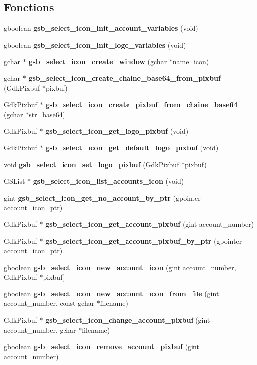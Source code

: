 \subsection*{Fonctions}
\begin{DoxyCompactItemize}
\item 
gboolean {\bf gsb\_\-select\_\-icon\_\-init\_\-account\_\-variables} (void)
\item 
gboolean {\bf gsb\_\-select\_\-icon\_\-init\_\-logo\_\-variables} (void)
\item 
gchar $\ast$ {\bf gsb\_\-select\_\-icon\_\-create\_\-window} (gchar $\ast$name\_\-icon)
\item 
gchar $\ast$ {\bf gsb\_\-select\_\-icon\_\-create\_\-chaine\_\-base64\_\-from\_\-pixbuf} (GdkPixbuf $\ast$pixbuf)
\item 
GdkPixbuf $\ast$ {\bf gsb\_\-select\_\-icon\_\-create\_\-pixbuf\_\-from\_\-chaine\_\-base64} (gchar $\ast$str\_\-base64)
\item 
GdkPixbuf $\ast$ {\bf gsb\_\-select\_\-icon\_\-get\_\-logo\_\-pixbuf} (void)
\item 
GdkPixbuf $\ast$ {\bf gsb\_\-select\_\-icon\_\-get\_\-default\_\-logo\_\-pixbuf} (void)
\item 
void {\bf gsb\_\-select\_\-icon\_\-set\_\-logo\_\-pixbuf} (GdkPixbuf $\ast$pixbuf)
\item 
GSList $\ast$ {\bf gsb\_\-select\_\-icon\_\-list\_\-accounts\_\-icon} (void)
\item 
gint {\bf gsb\_\-select\_\-icon\_\-get\_\-no\_\-account\_\-by\_\-ptr} (gpointer account\_\-icon\_\-ptr)
\item 
GdkPixbuf $\ast$ {\bf gsb\_\-select\_\-icon\_\-get\_\-account\_\-pixbuf} (gint account\_\-number)
\item 
GdkPixbuf $\ast$ {\bf gsb\_\-select\_\-icon\_\-get\_\-account\_\-pixbuf\_\-by\_\-ptr} (gpointer account\_\-icon\_\-ptr)
\item 
gboolean {\bf gsb\_\-select\_\-icon\_\-new\_\-account\_\-icon} (gint account\_\-number, GdkPixbuf $\ast$pixbuf)
\item 
gboolean {\bf gsb\_\-select\_\-icon\_\-new\_\-account\_\-icon\_\-from\_\-file} (gint account\_\-number, const gchar $\ast$filename)
\item 
GdkPixbuf $\ast$ {\bf gsb\_\-select\_\-icon\_\-change\_\-account\_\-pixbuf} (gint account\_\-number, gchar $\ast$filename)
\item 
gboolean {\bf gsb\_\-select\_\-icon\_\-remove\_\-account\_\-pixbuf} (gint account\_\-number)
\end{DoxyCompactItemize}

